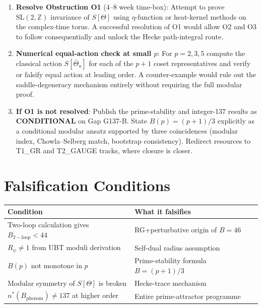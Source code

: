 \documentclass[12pt,a4paper]{article}
\theoremstyle{definition}
\theoremstyle{remark}
\begin{document}
\begin{enumerate}
  \item \textbf{Resolve Obstruction O1} (4--8 week time-box):  Attempt to
        prove $\mathrm{SL}(2,\mathbb{Z})$ invariance of $S[\Theta]$ using
        $\eta$-function or heat-kernel methods on the complex-time torus.
        A successful resolution of O1 would allow O2 and O3 to follow
        consequentially and unlock the Hecke path-integral route.
  \item \textbf{Numerical equal-action check at small $p$}:  For $p = 2, 3, 5$
        compute the classical action $S[\bar\Theta_a]$ for each of the $p+1$
        coset representatives and verify or falsify equal action at leading order.
        A counter-example would rule out the saddle-degeneracy mechanism entirely
        without requiring the full modular proof.
  \item \textbf{If O1 is not resolved}:  Publish the prime-stability and
        integer-137 results as \textbf{CONDITIONAL} on Gap G137-B.  State
        $B(p) = (p+1)/3$ explicitly as a conditional modular ansatz supported
        by three coincidences (modular index, Chowla--Selberg match, bootstrap
        consistency).  Redirect resources to T1\_GR and T2\_GAUGE tracks,
        where closure is closer.
\end{enumerate}

\section{Falsification Conditions}
\label{sec:falsification}

\begin{center}
\begin{tabular}{p{6cm}p{7.5cm}}
\toprule
\textbf{Condition} & \textbf{What it falsifies} \\
\midrule
Two-loop calculation gives $B_\mathrm{2-loop} < 44$ & RG+perturbative origin of $B = 46$ \\
$R_\psi \neq 1$ from UBT moduli derivation & Self-dual radius assumption \\
$B(p)$ not monotone in $p$ & Prime-stability formula $B = (p+1)/3$ \\
Modular symmetry of $S[\Theta]$ is broken & Hecke-trace mechanism \\
$n^*(B_\mathrm{phenom}) \neq 137$ at higher order & Entire prime-attractor programme \\
\bottomrule
\end{tabular}
\end{center}
\end{document}
